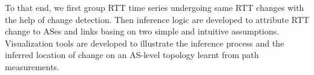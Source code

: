 To that end, we first group RTT time series undergoing same RTT changes with the help of change detection.
Then inference logic are developed to attribute RTT change to ASes and links basing on two simple and intuitive assumptions.
Visualization tools are developed to illustrate the inference process and the inferred location of change on an AS-level topology learnt from path measurements.
